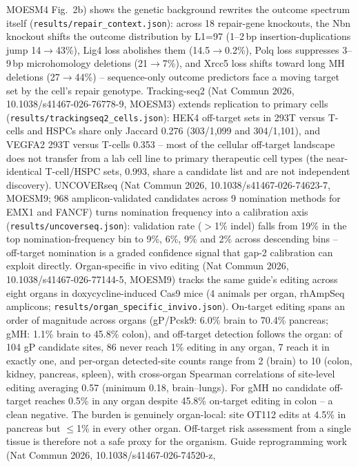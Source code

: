 \documentclass[12pt]{article}
\begin{document}
MOESM4 Fig.\ 2b) shows the genetic background rewrites the outcome
spectrum itself (\texttt{results/repair\_context.json}): across 18
repair-gene knockouts, the Nbn knockout shifts the outcome distribution
by L1=97 (1--2\,bp insertion-duplications jump 14$\to$43\%), Lig4 loss
abolishes them (14.5$\to$0.2\%), Polq loss suppresses 3--9\,bp
microhomology deletions (21$\to$7\%), and Xrcc5 loss shifts toward
long MH deletions (27$\to$44\%) -- sequence-only outcome predictors
face a moving target set by the cell's repair genotype.
Tracking-seq2 (Nat Commun 2026, 10.1038/s41467-026-76778-9, MOESM3)
extends replication to primary cells
(\texttt{results/trackingseq2\_cells.json}): HEK4 off-target sets in
293T versus T-cells and HSPCs share only Jaccard 0.276 (303/1{,}099 and
304/1{,}101), and VEGFA2 293T versus T-cells 0.353 -- most of the
cellular off-target landscape does not transfer from a lab cell line to
primary therapeutic cell types (the near-identical T-cell/HSPC sets,
0.993, share a candidate list and are not independent discovery).
UNCOVERseq (Nat Commun 2026, 10.1038/s41467-026-74623-7, MOESM9; 968
amplicon-validated candidates across 9 nomination methods for EMX1 and
FANCF) turns nomination frequency into a calibration axis
(\texttt{results/uncoverseq.json}): validation rate ($>$1\% indel)
falls from 19\% in the top nomination-frequency bin to 9\%, 6\%, 9\%
and 2\% across descending bins -- off-target nomination is a graded
confidence signal that gap-2 calibration can exploit directly.
Organ-specific in vivo editing (Nat Commun 2026,
10.1038/s41467-026-77144-5, MOESM9) tracks the same guide's editing
across eight organs in doxycycline-induced Cas9 mice (4 animals per
organ, rhAmpSeq amplicons; \texttt{results/organ\_specific\_invivo.json}).
On-target editing spans an order of magnitude across organs (gP/Pcsk9:
6.0\% brain to 70.4\% pancreas; gMH: 1.1\% brain to 45.8\% colon),
and off-target detection follows the organ: of 104 gP candidate sites,
86 never reach 1\% editing in any organ, 7 reach it in exactly one,
and per-organ detected-site counts range from 2 (brain) to 10 (colon,
kidney, pancreas, spleen), with cross-organ Spearman correlations of
site-level editing averaging 0.57 (minimum 0.18, brain--lungs). For
gMH no candidate off-target reaches 0.5\% in any organ despite
45.8\% on-target editing in colon -- a clean negative. The burden is
genuinely organ-local: site OT112 edits at 4.5\% in pancreas but
$\leq$1\% in every other organ. Off-target risk assessment from a
single tissue is therefore not a safe proxy for the organism.
Guide reprogramming work (Nat Commun 2026, 10.1038/s41467-026-74520-z,
\end{document}
